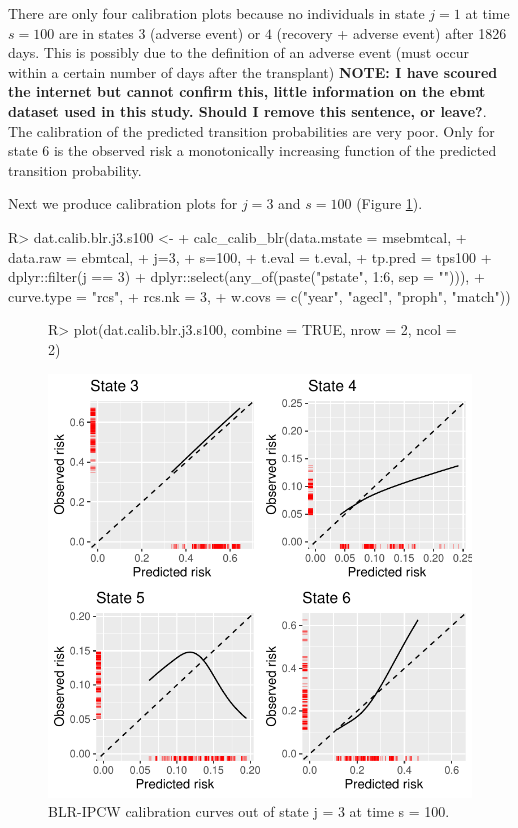\documentclass[nojss]{jss}
\begin{document}
There are only four calibration plots because no individuals in state $j = 1$ at time $s = 100$ are in states $3$ (adverse event) or $4$ (recovery + adverse event) after 1826 days. This is possibly due to the definition of an adverse event (must occur within a certain number of days after the transplant) \textbf{NOTE: I have scoured the internet but cannot confirm this, little information on the ebmt dataset used in this study. Should I remove this sentence, or leave?}. The calibration of the predicted transition probabilities are very poor. Only for state $6$ is the observed risk a monotonically increasing function of the predicted transition probability.

Next we produce calibration plots for $j = 3$ and $s = 100$ (Figure \ref{fig:blrj3s100}).

\begin{Schunk}
\begin{Sinput}
R> dat.calib.blr.j3.s100 <-
+    calc_calib_blr(data.mstate = msebmtcal,
+                   data.raw = ebmtcal,
+                   j=3,
+                   s=100,
+                   t.eval = t.eval,
+                   tp.pred = tps100 %
+                     dplyr::filter(j == 3) %
+                     dplyr::select(any_of(paste("pstate", 1:6, sep = ""))),
+                   curve.type = "rcs",
+                   rcs.nk = 3,
+                   w.covs = c("year", "agecl", "proph", "match"))
\end{Sinput}
\end{Schunk}

\begin{figure}
\centering
\begin{Schunk}
\begin{Sinput}
R> plot(dat.calib.blr.j3.s100, combine = TRUE, nrow = 2, ncol = 2)
\end{Sinput}
\end{Schunk}
\includegraphics{overview-012}
\caption{\label{fig:blrj3s100} BLR-IPCW calibration curves out of state j =  3 at time s = 100.}
\end{figure}
\end{document}
